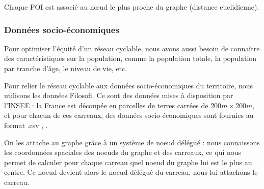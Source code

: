 Chaque POI est associé au nœud le plus proche du graphe (distance euclidienne). 

\subsubsection{Données socio-économiques}\label{sect:filo}

Pour optimiser l'équité d'un réseau cyclable, nous avons aussi besoin de connaître des caractéristiques sur la population, comme la population totale, la population par tranche d'âge, le niveau de vie, etc.

Pour relier le réseau cyclable aux données socio-économiques du territoire, nous utilisons les données Filosofi. Ce sont des données mises à disposition par l'INSEE : la France est découpée en parcelles de terres carrées de $200m \times 200m$, et pour chacun de ces carreaux, des données socio-économiques sont fournies au format .csv \cite{filosofidonnees}, \cite{filosoficarte}.

On les attache au graphe grâce à un système de noeud délégué : nous connaissons les coordonnées spaciales des noeuds du graphe et des carreaux, ce qui nous permet de calculer pour chaque carreau quel noeud du graphe lui est le plus au centre. Ce noeud devient alors le noeud délégué du carreau, nous lui attachons le carreau.




    
